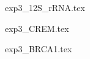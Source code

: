 \documentclass[12pt,a4paper]{article}
\begin{document}
\begin{figure}
{exp3_12S_rRNA.tex}
\end{figure}


\begin{figure}
{exp3_CREM.tex}
\end{figure}


\begin{figure}
{exp3_BRCA1.tex}
\end{figure}
\end{document}
